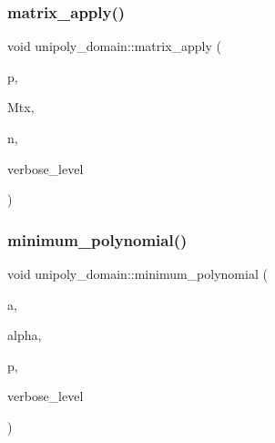 \mbox{\label{classunipoly__domain_a9309cff0210b5662113151229575bf4c}} 
\subsubsection{\texorpdfstring{matrix\+\_\+apply()}{matrix\_apply()}}
{\footnotesize\ttfamily void unipoly\+\_\+domain\+::matrix\+\_\+apply (\begin{DoxyParamCaption}\item[{\mbox{\hyperlink{galois_8h_a77ca58de3d2da6172242493dd9c8aaa8}{unipoly\+\_\+object}} \&}]{p,  }\item[{\mbox{\hyperlink{galois_8h_a09fddde158a3a20bd2dcadb609de11dc}{I\+NT}} $\ast$}]{Mtx,  }\item[{\mbox{\hyperlink{galois_8h_a09fddde158a3a20bd2dcadb609de11dc}{I\+NT}}}]{n,  }\item[{\mbox{\hyperlink{galois_8h_a09fddde158a3a20bd2dcadb609de11dc}{I\+NT}}}]{verbose\+\_\+level }\end{DoxyParamCaption})}

\mbox{\label{classunipoly__domain_ab80b3c8cfb24b3b4ce86ead7a5ebaa95}} 
\subsubsection{\texorpdfstring{minimum\+\_\+polynomial()}{minimum\_polynomial()}}
{\footnotesize\ttfamily void unipoly\+\_\+domain\+::minimum\+\_\+polynomial (\begin{DoxyParamCaption}\item[{\mbox{\hyperlink{galois_8h_a77ca58de3d2da6172242493dd9c8aaa8}{unipoly\+\_\+object}} \&}]{a,  }\item[{\mbox{\hyperlink{galois_8h_a09fddde158a3a20bd2dcadb609de11dc}{I\+NT}}}]{alpha,  }\item[{\mbox{\hyperlink{galois_8h_a09fddde158a3a20bd2dcadb609de11dc}{I\+NT}}}]{p,  }\item[{\mbox{\hyperlink{galois_8h_a09fddde158a3a20bd2dcadb609de11dc}{I\+NT}}}]{verbose\+\_\+level }\end{DoxyParamCaption})}

